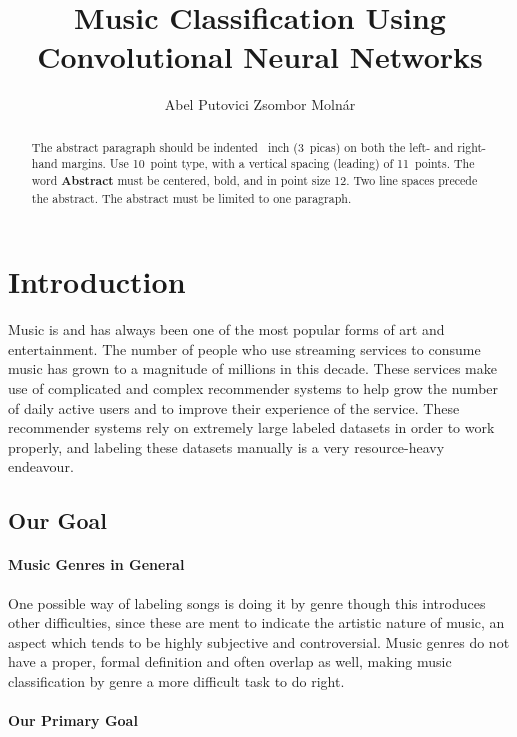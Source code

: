 \documentclass{article}
\title{Music Classification Using Convolutional Neural Networks}
\author{%
  Abel Putovici\And
	Zsombor Molnár
}
\begin{document}
\maketitle

\begin{abstract}
  The abstract paragraph should be indented ~inch (3~picas) on
  both the left- and right-hand margins. Use 10~point type, with a vertical
  spacing (leading) of 11~points.  The word \textbf{Abstract} must be centered,
  bold, and in point size 12. Two line spaces precede the abstract. The abstract
  must be limited to one paragraph.
\end{abstract}

\section{Introduction}

Music is and has always been one of the most popular forms of art and 
entertainment. The number of people who use streaming services to consume music 
has grown to a magnitude of millions in this decade. These services make use of 
complicated and complex recommender systems to help grow the number of 
daily active users and to improve their experience of the service. These recommender 
systems rely on extremely large labeled datasets in order to work properly, and 
labeling these datasets manually is a very resource-heavy endeavour. 

\subsection{Our Goal} 

\paragraph{Music Genres in General}

One possible way of labeling songs is doing it by genre though this introduces 
other difficulties, since these are ment to indicate the artistic nature of music, an 
aspect which tends to be highly subjective and controversial. Music genres do not have a 
proper, formal definition and often overlap as well, making music classification by 
genre a more difficult task to do right. 

\paragraph{Our Primary Goal}
\end{document}
